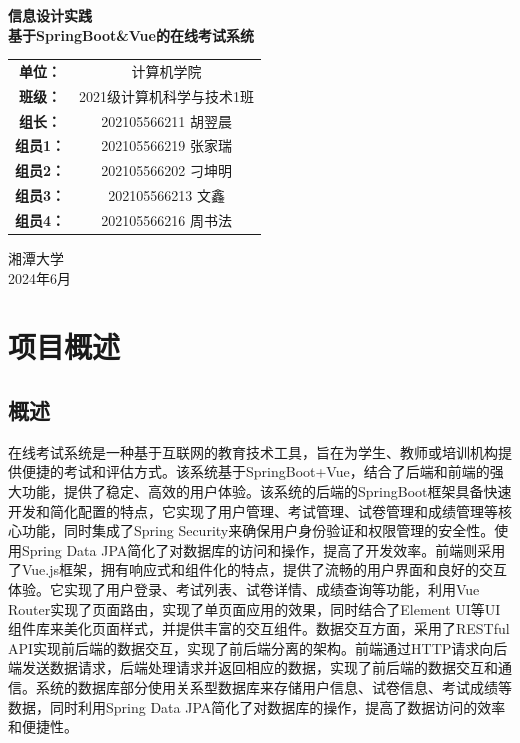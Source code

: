 \documentclass{article}
\begin{document}
\begin{titlepage}
    \begin{center}
        \bfseries\Huge{信息设计实践}\\
        \vspace{0.5cm}
        \bfseries\Large{基于SpringBoot\&Vue的在线考试系统}
        \vspace{5cm}
        \begin{center}\Large\linespread{2}
        \renewcommand\arraystretch{1.6}
        \begin{tabular}{cc}
            \bfseries{单位：} & 计算机学院\\ \cline{2-2}
            \bfseries{班级：} & 2021级计算机科学与技术1班\\ \cline{2-2}
            \bfseries{组长：} & 202105566211 胡翌晨\\ \cline{2-2}
            \bfseries{组员1：} & 202105566219 张家瑞\\ \cline{2-2}
            \bfseries{组员2：} & 202105566202 刁坤明\\ \cline{2-2}
            \bfseries{组员3：} & 202105566213 文鑫\\ \cline{2-2}
            \bfseries{组员4：} & 202105566216 周书法\\ \cline{2-2}
        \end{tabular}
        \end{center}
        \vspace{2cm}
        \Large{湘潭大学\\2024年6月}
    \end{center}
    \thispagestyle{empty}
    \restoregeometry
\end{titlepage}

\newpage
\tableofcontents
\newpage

\section{项目概述}

\subsection{概述}
在线考试系统是一种基于互联网的教育技术工具，旨在为学生、教师或培训机构提供便捷的考试和评估方式。该系统基于SpringBoot+Vue，结合了后端和前端的强大功能，提供了稳定、高效的用户体验。该系统的后端的SpringBoot框架具备快速开发和简化配置的特点，它实现了用户管理、考试管理、试卷管理和成绩管理等核心功能，同时集成了Spring Security来确保用户身份验证和权限管理的安全性。使用Spring Data JPA简化了对数据库的访问和操作，提高了开发效率。前端则采用了Vue.js框架，拥有响应式和组件化的特点，提供了流畅的用户界面和良好的交互体验。它实现了用户登录、考试列表、试卷详情、成绩查询等功能，利用Vue Router实现了页面路由，实现了单页面应用的效果，同时结合了Element UI等UI组件库来美化页面样式，并提供丰富的交互组件。数据交互方面，采用了RESTful API实现前后端的数据交互，实现了前后端分离的架构。前端通过HTTP请求向后端发送数据请求，后端处理请求并返回相应的数据，实现了前后端的数据交互和通信。系统的数据库部分使用关系型数据库来存储用户信息、试卷信息、考试成绩等数据，同时利用Spring Data JPA简化了对数据库的操作，提高了数据访问的效率和便捷性。
\end{document}
